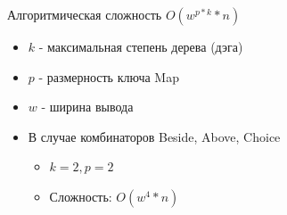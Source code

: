 \documentclass[sans]{beamer}
\begin{document}
\begin{frame}{Алгоритмическая сложность}
  $O(w^{p * k} * n)$
  \begin{itemize}
    \item $k$ - максимальная степень дерева (дэга)
    \item $p$ - размерность ключа Map
    \item $w$ - ширина вывода
    \item В случае комбинаторов Beside, Above, Choice
    \begin{itemize}
      \item $k = 2, p = 2$
      \item Сложность: $O(w^4 * n)$ 
    \end{itemize}
  \end{itemize}
\end{frame}
\end{document}

